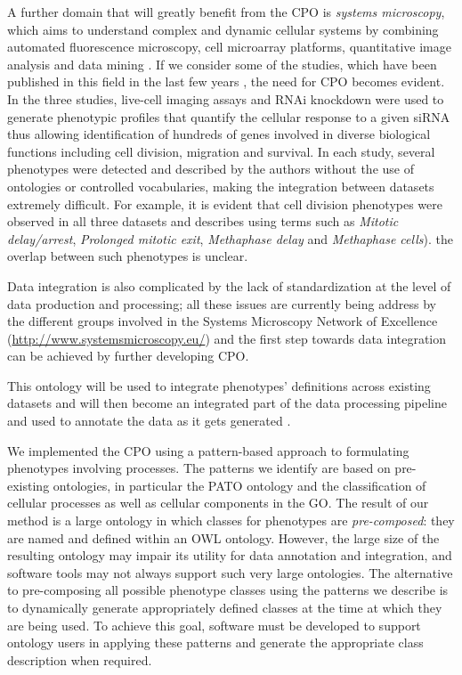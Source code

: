 \documentclass[11pt]{article}
\renewcommand{\cite}{\citep}
\begin{document}
A further domain that will greatly benefit from the CPO is {\em
  systems microscopy}, which aims to understand complex and dynamic
cellular systems by combining automated fluorescence microscopy, cell
microarray platforms, quantitative image analysis and data mining
\cite{Lock2010}.  If we consider some of the studies, which have been
published in this field in the last few years \cite{Neumann2010,
  Schmitz2010, Fuchs2010}, the need for CPO becomes evident.  In the
three studies, live-cell imaging assays and RNAi knockdown were used
to generate phenotypic profiles that quantify the cellular response to
a given siRNA thus allowing identification of hundreds of genes
involved in diverse biological functions including cell division,
migration and survival.  In each study, several phenotypes were
detected and described by the authors without the use of ontologies or
controlled vocabularies, making the integration between datasets
extremely difficult. For example, it is evident that cell division
phenotypes were observed in all three datasets and describes using
terms such as {\em Mitotic delay/arrest}, {\em Prolonged mitotic
  exit}, {\em Methaphase delay} and {\em Methaphase cells}). the
overlap between such phenotypes is unclear.

Data integration is also complicated by the lack of standardization at
the level of data production and processing; all these issues are
currently being address by the different groups involved in the
Systems Microscopy Network of Excellence
(\url{http://www.systemsmicroscopy.eu/}) and the first step towards
data integration can be achieved by further developing CPO.

This ontology will be used to integrate phenotypes' definitions across
existing datasets and will then become an integrated part of the data
processing pipeline and used to annotate the data as it gets generated
\cite{Conrad2011}.

We implemented the CPO using a pattern-based approach to formulating
phenotypes involving processes. The patterns we identify are based on
pre-existing ontologies, in particular the PATO ontology and the
classification of cellular processes as well as cellular components in
the GO. The result of our method is a large ontology in which classes
for phenotypes are {\em pre-composed}: they are named and defined
within an OWL ontology. However, the large size of the resulting
ontology may impair its utility for data annotation and integration,
and software tools may not always support such very large
ontologies. The alternative to pre-composing all possible phenotype
classes using the patterns we describe is to dynamically generate
appropriately defined classes at the time at which they are being
used. To achieve this goal, software must be developed to support
ontology users in applying these patterns and generate the appropriate
class description when required.
\end{document}
